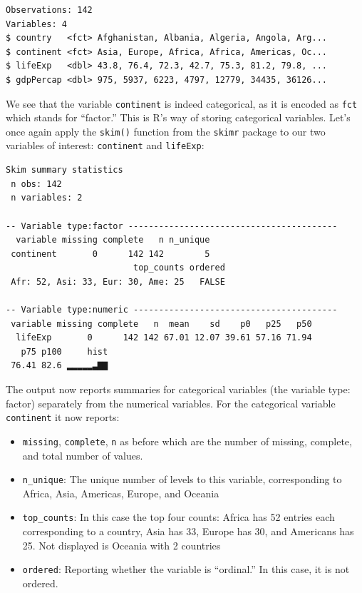 \documentclass[12pt,]{krantz}
\makeatletter
\newenvironment{Shaded}{\begin{snugshade}}{\end{snugshade}}
\newcommand{\KeywordTok}[1]{\textcolor[rgb]{0.27,0.27,0.27}{\textbf{#1}}}
\newcommand{\StringTok}[1]{\textcolor[rgb]{0.5,0.5,0.5}{#1}}
\newcommand{\OperatorTok}[1]{\textcolor[rgb]{0.43,0.43,0.43}{\textbf{#1}}}
\newcommand{\NormalTok}[1]{#1}
\providecommand{\tightlist}{%
  \setlength{\itemsep}{0pt}\setlength{\parskip}{0pt}}
\newenvironment{kframe}{%
\medskip{}
\setlength{\fboxsep}{.8em}
 \def\at@end@of@kframe{}%
 \ifinner\ifhmode%
  \def\at@end@of@kframe{\end{minipage}}%
  \begin{minipage}{\columnwidth}%
 \fi\fi%
 \def\FrameCommand##1{\hskip\@totalleftmargin \hskip-\fboxsep
 \colorbox{shadecolor}{##1}\hskip-\fboxsep
     \hskip-\linewidth \hskip-\@totalleftmargin \hskip\columnwidth}%
 \MakeFramed {\advance\hsize-\width
   \@totalleftmargin\z@ \linewidth\hsize
   \@setminipage}}%
 {\par\unskip\endMakeFramed%
 \at@end@of@kframe}
\renewenvironment{Shaded}{\begin{kframe}}{\end{kframe}}
\makeatother
\begin{document}
\begin{verbatim}
Observations: 142
Variables: 4
$ country   <fct> Afghanistan, Albania, Algeria, Angola, Arg...
$ continent <fct> Asia, Europe, Africa, Africa, Americas, Oc...
$ lifeExp   <dbl> 43.8, 76.4, 72.3, 42.7, 75.3, 81.2, 79.8, ...
$ gdpPercap <dbl> 975, 5937, 6223, 4797, 12779, 34435, 36126...
\end{verbatim}

We see that the variable \texttt{continent} is indeed categorical, as it
is encoded as \texttt{fct} which stands for ``factor.'' This is R's way
of storing categorical variables. Let's once again apply the
\texttt{skim()} function from the \texttt{skimr} package to our two
variables of interest: \texttt{continent} and \texttt{lifeExp}:

\begin{Shaded}
\end{Shaded}

\begin{verbatim}
Skim summary statistics
 n obs: 142 
 n variables: 2 

-- Variable type:factor -----------------------------------------
  variable missing complete   n n_unique
 continent       0      142 142        5
                         top_counts ordered
 Afr: 52, Asi: 33, Eur: 30, Ame: 25   FALSE

-- Variable type:numeric ----------------------------------------
 variable missing complete   n  mean    sd    p0   p25   p50
  lifeExp       0      142 142 67.01 12.07 39.61 57.16 71.94
   p75 p100     hist
 76.41 82.6 ▂▂▂▂▂▃▇▇
\end{verbatim}

The output now reports summaries for categorical variables (the variable
type: factor) separately from the numerical variables. For the
categorical variable \texttt{continent} it now reports:

\begin{itemize}
\tightlist
\item
  \texttt{missing}, \texttt{complete}, \texttt{n} as before which are
  the number of missing, complete, and total number of values.
\item
  \texttt{n\_unique}: The unique number of levels to this variable,
  corresponding to Africa, Asia, Americas, Europe, and Oceania
\item
  \texttt{top\_counts}: In this case the top four counts: Africa has 52
  entries each corresponding to a country, Asia has 33, Europe has 30,
  and Americans has 25. Not displayed is Oceania with 2 countries
\item
  \texttt{ordered}: Reporting whether the variable is ``ordinal.'' In
  this case, it is not ordered.
\end{itemize}
\end{document}

